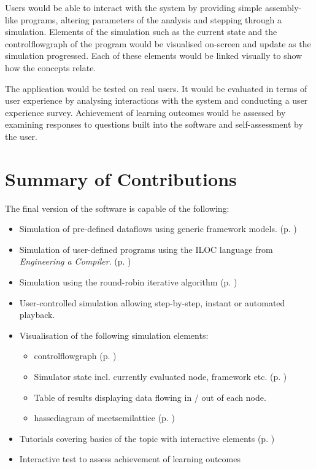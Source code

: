 \documentclass[bsc,twoside,singlespacing,parskip,logo,notimes,normalheadings]{infthesis}
\begin{document}
    Users would be able to interact with the system by providing
    simple assembly-like programs, altering parameters of the analysis
    and stepping through a simulation. Elements of the simulation such
    as the current state and the \gls{controlflowgraph} of the program
    would be visualised on-screen and update as the simulation
    progressed. Each of these elements would be linked visually to
    show how the concepts relate.
    
    The application would be tested on real users. It would be
    evaluated in terms of user experience by analysing interactions
    with the system and conducting a user experience
    survey. Achievement of learning outcomes would be assessed by
    examining responses to questions built into the software and
    self-assessment by the user.
    
    \section{Summary of Contributions}
    The final version of the software is capable of the following:
    
    \begin{itemize}
    \item Simulation of pre-defined \gls{dataflow}s using generic
      framework models. (p. )%
    \item Simulation of user-defined programs using the
      ILOC\cite[appx.~A]{eac} language from {\em Engineering a
        Compiler}. (p. )%
    \item Simulation using the round-robin iterative algorithm (p.
      ) %
    \item User-controlled simulation allowing step-by-step, instant or
      automated playback.
    \item Visualisation of the following simulation elements:
      \begin{itemize}
      \item \Gls{controlflowgraph} (p. )%
      \item Simulator state incl. currently evaluated node,
        framework etc. (p. )%
      \item Table of results displaying data flowing in / out of each
        node.
      \item \Gls{hassediagram} of \gls{meetsemilattice} (p.
        ) %
      \end{itemize}
    \item Tutorials covering basics of the topic with interactive
      elements (p. )%
    \item Interactive test to assess achievement of learning outcomes
    \end{itemize}
\end{document}
